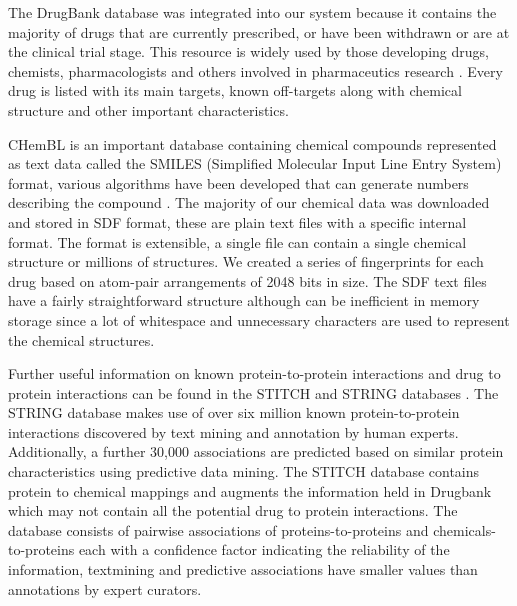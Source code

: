 \documentclass[preprint,12pt]{elsarticle}
\begin{document}
The DrugBank database was integrated into our system because it contains the majority of drugs that are currently prescribed, or have been withdrawn or are at the clinical trial stage. This resource is widely used by those developing drugs, chemists, pharmacologists and others involved in pharmaceutics research \cite{Law2014}. Every drug is listed with its main targets, known off-targets along with chemical structure and other important characteristics. 

CHemBL is an important database containing chemical compounds represented as text data called the SMILES (Simplified Molecular Input Line Entry System) format,  various algorithms have been developed that can generate numbers describing the compound \cite{Weininger1988}. The majority of our chemical data was downloaded and stored in SDF format, these are plain text files with a specific internal format. The format is extensible, a single file can contain a single chemical structure or millions of structures. We created a series of fingerprints for each drug based on atom-pair arrangements of 2048 bits in size. The SDF text files have a fairly straightforward structure although can be inefficient in memory storage since a lot of whitespace and unnecessary characters are used to represent the chemical structures.

Further useful information on known protein-to-protein interactions and drug to protein interactions can be found in the STITCH and STRING databases \cite{Kuhn2012}. The STRING database  makes use of over six million known protein-to-protein interactions discovered by text mining and annotation by human experts. Additionally,  a further 30,000 associations are predicted based on similar protein characteristics using predictive data mining. The STITCH database contains protein to chemical mappings and augments the information held in Drugbank which may not contain all the potential drug to protein interactions. The database consists of pairwise associations of proteins-to-proteins and chemicals-to-proteins each with a confidence factor indicating the reliability of the information, textmining and predictive associations have smaller values than annotations by expert curators.
\end{document}
